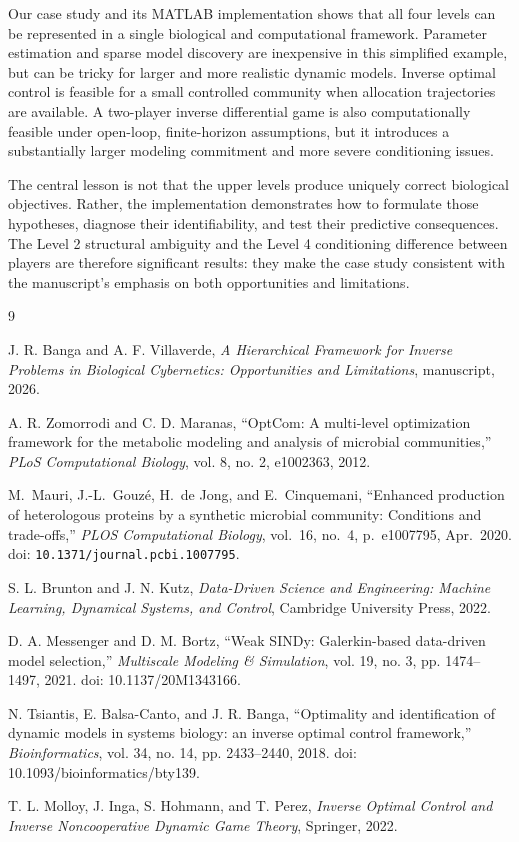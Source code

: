 \documentclass[11pt,a4paper]{article}
\begin{document}
Our case study and its MATLAB implementation shows that all four levels can be represented in a
single biological and computational framework. Parameter estimation and sparse
model discovery are inexpensive in this simplified example, but can be tricky for larger and more realistic dynamic models.
Inverse optimal control is feasible for a small controlled community when
allocation trajectories are available. A two-player inverse differential game
is also computationally feasible under open-loop, finite-horizon assumptions,
but it introduces a substantially larger modeling commitment and more severe
conditioning issues.

The central lesson is not that the upper levels produce uniquely correct
biological objectives. Rather, the implementation demonstrates how to formulate
those hypotheses, diagnose their identifiability, and test their predictive
consequences. The Level 2 structural ambiguity and the Level 4 conditioning
difference between players are therefore significant results: they make the
case study consistent with the manuscript's emphasis on both opportunities and
limitations.

\begin{thebibliography}{9}

J. R. Banga and A. F. Villaverde,
\emph{A Hierarchical Framework for Inverse Problems in Biological
Cybernetics: Opportunities and Limitations},
manuscript, 2026.

A. R. Zomorrodi and C. D. Maranas,
``OptCom: A multi-level optimization framework for the metabolic modeling and
analysis of microbial communities,''
\emph{PLoS Computational Biology}, vol. 8, no. 2, e1002363, 2012.

M.~Mauri, J.-L.~Gouzé, H.~de Jong, and E.~Cinquemani,
``Enhanced production of heterologous proteins by a synthetic microbial community: Conditions and trade-offs,''
\emph{PLOS Computational Biology}, vol.~16, no.~4, p.~e1007795, Apr.~2020.
doi: \texttt{10.1371/journal.pcbi.1007795}.

S. L. Brunton and J. N. Kutz,
\emph{Data-Driven Science and Engineering: Machine Learning, Dynamical
Systems, and Control},
Cambridge University Press, 2022.

D. A. Messenger and D. M. Bortz,
``Weak SINDy: Galerkin-based data-driven model selection,''
\emph{Multiscale Modeling \& Simulation}, vol. 19, no. 3,
pp. 1474--1497, 2021.
doi: 10.1137/20M1343166.

N. Tsiantis, E. Balsa-Canto, and J. R. Banga,
``Optimality and identification of dynamic models in systems biology:
an inverse optimal control framework,''
\emph{Bioinformatics}, vol. 34, no. 14, pp. 2433--2440, 2018.
doi: 10.1093/bioinformatics/bty139.

T. L. Molloy, J. Inga, S. Hohmann, and T. Perez,
\emph{Inverse Optimal Control and Inverse Noncooperative Dynamic Game Theory},
Springer, 2022.


\end{thebibliography}
\end{document}
